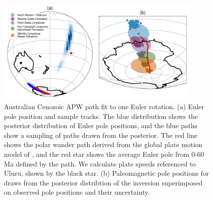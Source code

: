 \documentclass[preprint,12pt,authoryear]{elsarticle}
\begin{document}
\begin{figure}
\includegraphics[width=0.9\textwidth]{figures/australia/australia_paths_1.pdf}
\caption[Australian Cenozoic APW path fit to one Euler rotation.]{Australian Cenozoic APW path fit to one Euler rotation. 
(a) Euler pole position and sample tracks. The blue distribution shows the posterior distribution of Euler pole positions, and the blue paths show a sampling of paths drawn from the posterior. The red line shows the polar wander path derived from the global plate motion model of \citet{seton2012global}, and the red star shows the average Euler pole from 0-60 Ma defined by the \citet{seton2012global} path. We calculate plate speeds referenced to Uluru, shown by the black star.
(b) Paleomagnetic pole positions for draws from the posterior distribtion of the inversion superimposed on observed pole positions and their uncertainty.}
\label{fig:australia_paths_1}
\end{figure}
\end{document}
